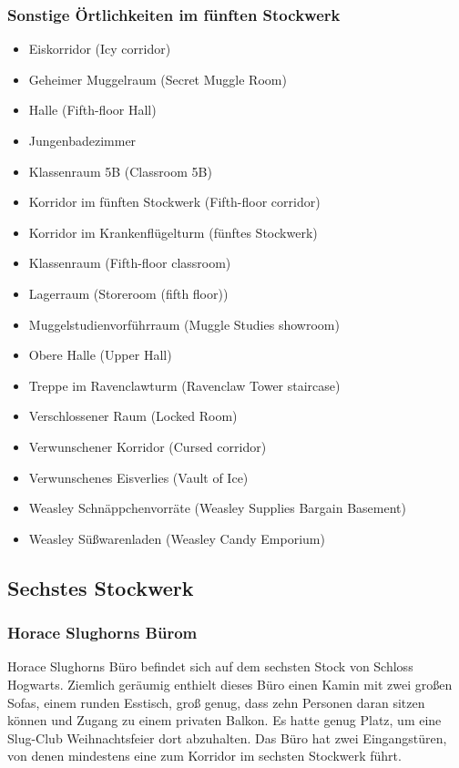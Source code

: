\documentclass[a4paper, 10pt]{article}
\begin{document}
\subsubsection*{\large Sonstige Örtlichkeiten im fünften Stockwerk}
\vspace{10pt}
\begin{itemize}
    \item Eiskorridor (Icy corridor)
    \item Geheimer Muggelraum (Secret Muggle Room)
    \item Halle (Fifth-floor Hall)
    \item Jungenbadezimmer
    \item Klassenraum 5B (Classroom 5B)
    \item Korridor im fünften Stockwerk (Fifth-floor corridor)
    \item Korridor im Krankenflügelturm (fünftes Stockwerk)
    \item Klassenraum (Fifth-floor classroom)
    \item Lagerraum (Storeroom (fifth floor))
    \item Muggelstudienvorführraum (Muggle Studies showroom)
    \item Obere Halle (Upper Hall)
    \item Treppe im Ravenclawturm (Ravenclaw Tower staircase)
    \item Verschlossener Raum (Locked Room)
    \item Verwunschener Korridor (Cursed corridor)
    \item Verwunschenes Eisverlies (Vault of Ice)
    \item Weasley Schnäppchenvorräte (Weasley Supplies Bargain Basement)
    \item Weasley Süßwarenladen (Weasley Candy Emporium)
\end{itemize}

\subsection*{\Large Sechstes Stockwerk}
\subsubsection*{\large Horace Slughorns Bürom}
Horace Slughorns Büro befindet sich auf dem sechsten Stock von Schloss Hogwarts. Ziemlich geräumig enthielt dieses Büro einen Kamin mit zwei großen Sofas, einem runden Esstisch, groß genug, dass zehn Personen daran sitzen können und Zugang zu einem privaten Balkon. Es hatte genug Platz, um eine Slug-Club Weihnachtsfeier dort abzuhalten. Das Büro hat zwei Eingangstüren, von denen mindestens eine zum Korridor im sechsten Stockwerk führt.
\end{document}
